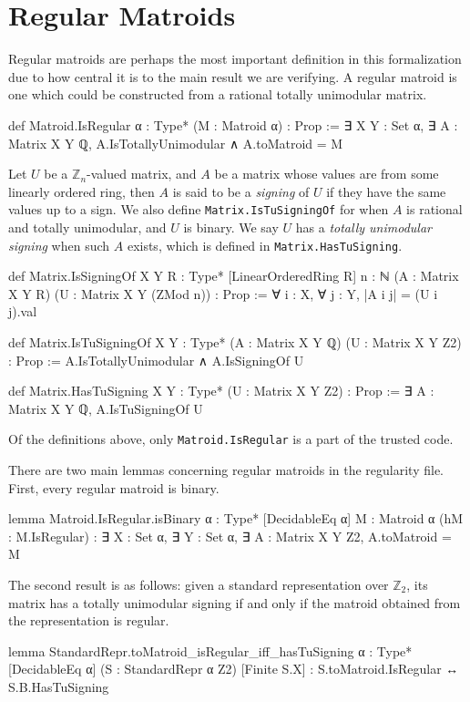 \section{Regular Matroids}
\label{sec:regular_matroid}

Regular matroids are perhaps the most important definition in this formalization due to how central it is to the main result we are verifying.
A regular matroid is one which could be constructed from a rational totally unimodular matrix.

\begin{leancode}
def Matroid.IsRegular {α : Type*}
    (M : Matroid α) : Prop :=
  ∃ X Y : Set α, ∃ A : Matrix X Y ℚ, 
    A.IsTotallyUnimodular ∧ A.toMatroid = M
\end{leancode} 

Let $U$ be a $\mathbb{Z}_n$-valued matrix, and $A$ be a matrix whose values are from some linearly ordered ring, then $A$ is said to be a \emph{signing} of $U$ if they have the same values up to a sign. We also define \texttt{Matrix.IsTuSigningOf} for when $A$ is rational and totally unimodular, and $U$ is binary. We say $U$ has a \emph{totally unimodular signing} when such $A$ exists, which is defined in \texttt{Matrix.HasTuSigning}.

\begin{leancode}
def Matrix.IsSigningOf {X Y R : Type*}
    [LinearOrderedRing R] {n : ℕ}
    (A : Matrix X Y R) (U : Matrix X Y (ZMod n)) :
    Prop :=
  ∀ i : X, ∀ j : Y, |A i j| = (U i j).val
\end{leancode}

\begin{leancode}
def Matrix.IsTuSigningOf {X Y : Type*} 
    (A : Matrix X Y ℚ) (U : Matrix X Y Z2) :
    Prop :=
  A.IsTotallyUnimodular ∧ A.IsSigningOf U
\end{leancode}

\begin{leancode}
def Matrix.HasTuSigning {X Y : Type*} 
    (U : Matrix X Y Z2) : Prop :=
  ∃ A : Matrix X Y ℚ, A.IsTuSigningOf U
\end{leancode}

Of the definitions above, only \texttt{Matroid.IsRegular} is a part of the trusted code.

There are two main lemmas concerning regular matroids in the regularity file. First, every regular matroid is binary. 

\begin{leancode}
lemma Matroid.IsRegular.isBinary
    {α : Type*} [DecidableEq α]
    {M : Matroid α} (hM : M.IsRegular) :
  ∃ X : Set α, ∃ Y : Set α, ∃ A : Matrix X Y Z2, 
    A.toMatroid = M
\end{leancode}

The second result is as follows: given a standard representation over $\mathbb{Z}_2$, its matrix has a totally unimodular signing if and only if the matroid obtained from the representation is regular.

\begin{leancode}
lemma StandardRepr.toMatroid_isRegular_iff_hasTuSigning 
    {α : Type*} [DecidableEq α]
    (S : StandardRepr α Z2) [Finite S.X] :
  S.toMatroid.IsRegular ↔ S.B.HasTuSigning
\end{leancode} 

